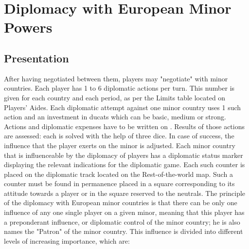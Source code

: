 
\section{Diplomacy with European Minor Powers}




\subsection{Presentation}

After having negotiated between them, players may "negotiate" with minor
countries. Each player has 1 to 6 diplomatic actions per turn. This number is
given for each country and each period, as per the Limits table located on
Players' Aides.  Each diplomatic attempt against one minor country uses 1 such
action and an investment in ducats which can be basic, medium or strong.
Actions and diplomatic expenses have to be written on .
Results of those actions are assessed: each is solved with the help of three
dice. In case of success, the influence that the player exerts on the minor is
adjusted.  Each minor country that is influenceable by the diplomacy of
players has a diplomatic status marker displaying the relevant indications for
the diplomatic game.  Each such counter is placed on the diplomatic track
located on the Rest-of-the-world map. Such a counter must be found in
permanence placed in a square corresponding to its attitude towards a player
or in the square reserved to the neutrals.
The principle of the diplomacy with European minor countries is that there can
be only one influence of any one single player on a given minor, meaning that
this player has a preponderant influence, or diplomatic control of the minor
country; he is also names the "Patron" of the minor country. This influence is
divided into different levels of increasing importance, which are:
\begin{deflist}
    
   
\end{deflist}

